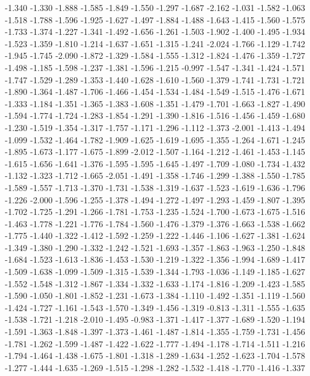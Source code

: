 \documentclass[9pt]{article}
\theoremstyle{plain}
\theoremstyle{definition}
\theoremstyle{remark}
\numberwithin{equation}{section}
\begin{document}
-1.340
-1.330
-1.888
-1.585
-1.849
-1.550
-1.297
-1.687
-2.162
-1.031
-1.582
-1.063
-1.518
-1.788
-1.596
-1.925
-1.627
-1.497
-1.884
-1.488
-1.643
-1.415
-1.560
-1.575
-1.733
-1.374
-1.227
-1.341
-1.492
-1.656
-1.261
-1.503
-1.902
-1.400
-1.495
-1.934
-1.523
-1.359
-1.810
-1.214
-1.637
-1.651
-1.315
-1.241
-2.024
-1.766
-1.129
-1.742
-1.945
-1.745
-2.090
-1.872
-1.329
-1.584
-1.555
-1.312
-1.824
-1.476
-1.359
-1.727
-1.498
-1.185
-1.598
-1.237
-1.381
-1.596
-1.215
-0.997
-1.547
-1.341
-1.424
-1.571
-1.747
-1.529
-1.289
-1.353
-1.440
-1.628
-1.610
-1.560
-1.379
-1.741
-1.731
-1.721
-1.890
-1.364
-1.487
-1.706
-1.466
-1.454
-1.534
-1.484
-1.549
-1.515
-1.476
-1.671
-1.333
-1.184
-1.351
-1.365
-1.383
-1.608
-1.351
-1.479
-1.701
-1.663
-1.827
-1.490
-1.594
-1.774
-1.724
-1.283
-1.854
-1.291
-1.390
-1.816
-1.516
-1.456
-1.459
-1.680
-1.230
-1.519
-1.354
-1.317
-1.757
-1.171
-1.296
-1.112
-1.373
-2.001
-1.413
-1.494
-1.099
-1.532
-1.464
-1.782
-1.909
-1.625
-1.619
-1.695
-1.355
-1.264
-1.671
-1.245
-1.895
-1.673
-1.177
-1.675
-1.899
-2.012
-1.507
-1.164
-1.212
-1.461
-1.453
-1.145
-1.615
-1.656
-1.641
-1.376
-1.595
-1.595
-1.645
-1.497
-1.709
-1.080
-1.734
-1.432
-1.132
-1.323
-1.712
-1.665
-2.051
-1.491
-1.358
-1.746
-1.299
-1.388
-1.550
-1.785
-1.589
-1.557
-1.713
-1.370
-1.731
-1.538
-1.319
-1.637
-1.523
-1.619
-1.636
-1.796
-1.226
-2.000
-1.596
-1.255
-1.378
-1.494
-1.272
-1.497
-1.293
-1.459
-1.807
-1.395
-1.702
-1.725
-1.291
-1.266
-1.781
-1.753
-1.235
-1.524
-1.700
-1.673
-1.675
-1.516
-1.463
-1.778
-1.221
-1.776
-1.784
-1.560
-1.476
-1.379
-1.376
-1.663
-1.538
-1.662
-1.775
-1.440
-1.322
-1.412
-1.592
-1.259
-1.222
-1.446
-1.106
-1.627
-1.381
-1.624
-1.349
-1.380
-1.290
-1.332
-1.242
-1.521
-1.693
-1.357
-1.863
-1.963
-1.250
-1.848
-1.684
-1.523
-1.613
-1.836
-1.453
-1.530
-1.219
-1.322
-1.356
-1.994
-1.689
-1.417
-1.509
-1.638
-1.099
-1.509
-1.315
-1.539
-1.344
-1.793
-1.036
-1.149
-1.185
-1.627
-1.552
-1.548
-1.312
-1.867
-1.334
-1.332
-1.633
-1.174
-1.816
-1.209
-1.423
-1.585
-1.590
-1.050
-1.801
-1.852
-1.231
-1.673
-1.384
-1.110
-1.492
-1.351
-1.119
-1.560
-1.424
-1.727
-1.161
-1.543
-1.570
-1.349
-1.456
-1.319
-0.813
-1.311
-1.555
-1.635
-1.538
-1.721
-1.218
-2.010
-1.495
-0.983
-1.371
-1.417
-1.377
-1.689
-1.520
-1.194
-1.591
-1.363
-1.848
-1.397
-1.373
-1.461
-1.487
-1.814
-1.355
-1.759
-1.731
-1.456
-1.781
-1.262
-1.599
-1.487
-1.422
-1.622
-1.777
-1.494
-1.178
-1.714
-1.511
-1.216
-1.794
-1.464
-1.438
-1.675
-1.801
-1.318
-1.289
-1.634
-1.252
-1.623
-1.704
-1.578
-1.277
-1.444
-1.635
-1.269
-1.515
-1.298
-1.282
-1.532
-1.418
-1.770
-1.416
-1.337
\end{document}

